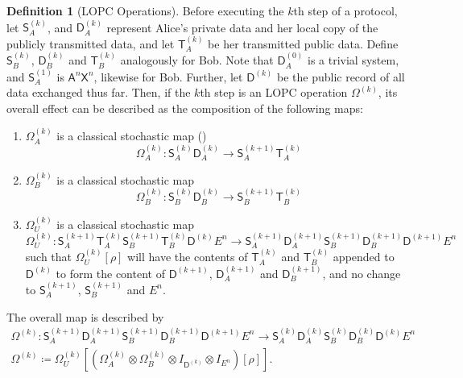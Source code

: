 \documentclass[10pt, a4paper]{article}
\numberwithin{equation}{section} %
\newcounter{stmt} %
\theoremstyle{definition}
\newtheorem{defn}[stmt]{Definition}
\theoremstyle{plain}
\newcommand{\?}{\mathrel{?}} %
\newcommand{\crv}[1]{\mathsf{#1}}
\begin{document}
    \begin{defn}[LOPC Operations]
      Before executing the \(k\)th step of a protocol, let \(\crv{S}_A^{(k)}\), and \(\crv{D}_A^{(k)}\) represent Alice's private data and her local copy of the publicly transmitted data, and let \(\crv{T}^{(k)}_A\) be her transmitted public data. Define \(\crv{S}_B^{(k)}\), \(\crv{D}_B^{(k)}\) and \(\crv{T}_B^{(k)}\) analogously for Bob. Note that \(\crv{D}^{(0)}_A\) is a trivial system, and \(\crv{S}_A^{(1)}\) is \(\crv{A}^{n}\crv{X}^{n}\), likewise for Bob. Further, let \(\crv{D}^{(k)}\) be the public record of all data exchanged thus far. Then, if the \(k\)th step is an LOPC operation \(\Omega^{(k)}\), its overall effect can be described as the composition of the following maps:
      \begin{enumerate}
        \item \(\Omega_A^{(k)}\) is a classical stochastic map ()
      \begin{equation}
        \Omega_A^{(k)} : \crv{S}_A^{(k)}\crv{D}_A^{(k)} \to \crv{S}_A^{(k+1)}\crv{T}_A^{(k)}
      \end{equation}
        \item \(\Omega_B^{(k)}\) is a classical stochastic map 
      \begin{equation}
        \Omega_B^{(k)} : \crv{S}_B^{(k)}\crv{D}_B^{(k)} \to \crv{S}_B^{(k+1)}\crv{T}_B^{(k)}
      \end{equation}
    \item \(\Omega_U^{(k)}\) is a classical stochastic map
      \begin{equation}
        \Omega_U^{(k)} : \crv{S}_A^{(k+1)}\crv{T}_A^{(k)}
        \crv{S}_B^{(k+1)}\crv{T}_B^{(k)}
        \crv{D}^{(k)}E^n \to
        \crv{S}_A^{(k+1)}\crv{D}_A^{(k+1)}
        \crv{S}_B^{(k+1)}\crv{D}_B^{(k+1)}
        \crv{D}^{(k+1)}E^n
      \end{equation}
      such that \(\Omega_U^{(k)}\left[\rho\right]\) will have the contents of \(\crv{T}^{(k)}_A\) and \(\crv{T}^{(k)}_B\) appended to \(\crv{D}^{(k)}\) to form the content of \(\crv{D}^{(k+1)}\), \(\crv{D}_A^{(k+1)}\) and \(\crv{D}_B^{(k+1)}\), and no change to \(\crv{S}_A^{(k+1)}\), \(\crv{S}_B^{(k+1)}\) and \(E^n\).
      \end{enumerate}
    \item The overall map is described by
      \begin{gather}
        \Omega^{(k)} : \crv{S}_A^{(k+1)}\crv{D}_A^{(k+1)}
        \crv{S}_B^{(k+1)}\crv{D}_B^{(k+1)}\crv{D}^{(k+1)}E^n \to
        \crv{S}_A^{(k)}\crv{D}_A^{(k)}
        \crv{S}_B^{(k)}\crv{D}_B^{(k)}
        \crv{D}^{(k)}E^n \\
        \Omega^{(k)} \coloneqq \Omega_U^{(k)}\left[\left(\Omega_A^{(k)} \otimes \Omega_B^{(k)} \otimes I_{\crv{D}^{(k)}} \otimes I_{E^n}\right)\left[\rho\right] \right].
      \end{gather}
    \end{defn}
\end{document}
